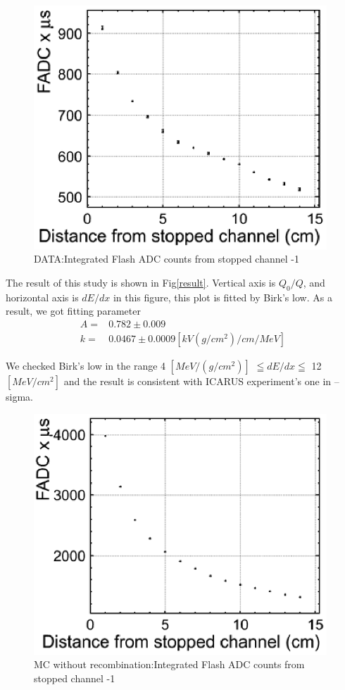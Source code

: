 \begin{figure}[!htb]
  \centering
  \centering
  \includegraphics[width=11cm,clip]{./fig/q.eps}
  \caption{DATA:Integrated Flash ADC counts from stopped channel -1}
  \label{fadcDist1}
\end{figure}
\pagebreak
\pagebreak

The result of this study is shown in Fig\ref{result}. Vertical axis is $Q_{0}/Q$, and horizontal axis is $dE/dx$ in this figure, this plot is fitted by Birk's low.
As a result, we got fitting parameter\\
\begin{eqnarray}
 \nonumber  A =& 0.782\pm0.009\\
   k =& 0.0467\pm0.0009 [kV(g/cm^{2})/cm/MeV]
\end{eqnarray}

We checked Birk's low in the range 4 $[MeV/(g/cm^2)]$ $\leqq dE/dx \leqq$ 12 $[MeV/cm^2]$ and the result is consistent with ICARUS experiment's one in -- sigma.

\begin{figure}[!htb]
  \centering
  \centering
  \includegraphics[width=11cm,clip]{./fig/q_0.eps}
  \caption{MC without recombination:Integrated Flash ADC counts from stopped channel -1}
  \label{fadcDistMC}
\end{figure}

